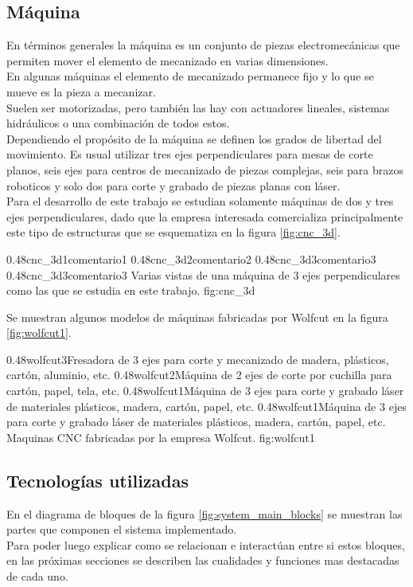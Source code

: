 \subsection{Máquina}
En términos generales la máquina es un conjunto de piezas electromecánicas que permiten mover el elemento de mecanizado en varias dimensiones.\\
En algunas máquinas el elemento de mecanizado permanece fijo y lo que se mueve es la pieza a mecanizar.\\
Suelen ser motorizadas, pero también las hay con actuadores lineales, sistemas hidráulicos o una combinación de todos estos.\\
Dependiendo el propósito de la máquina se definen los grados de libertad del movimiento.
Es usual utilizar tres ejes perpendiculares para mesas de corte planos, seis ejes para centros de mecanizado de piezas complejas, seis para brazos roboticos y solo dos para corte y grabado de piezas planas con láser.\\
Para el desarrollo de este trabajo se estudian solamente máquinas de dos y tres ejes perpendiculares, dado que la empresa interesada comercializa principalmente este tipo de estructuras que se esquematiza en la figura \ref{fig:cnc_3d}.

\subfigtwotwo
            {0.48}{cnc_3d1}{comentario1}
            {0.48}{cnc_3d2}{comentario2}
            {0.48}{cnc_3d3}{comentario3}
            {0.48}{cnc_3d3}{comentario3}
            {Varias vistas de una máquina de 3 ejes perpendiculares como las que se estudia en este trabajo.}
            {fig:cnc_3d}

Se muestran algunos modelos de máquinas fabricadas por Wolfcut en la figura \ref{fig:wolfcut1}.

\subfigtwotwo
            {0.48}{wolfcut3}{Fresadora de 3 ejes para corte y mecanizado de madera, plásticos, cartón, aluminio, etc.}
            {0.48}{wolfcut2}{Máquina de 2 ejes de corte por cuchilla para cartón, papel, tela, etc.}
            {0.48}{wolfcut1}{Máquina de 3 ejes para corte y grabado láser de materiales plásticos, madera, cartón, papel, etc.}
            {0.48}{wolfcut1}{Máquina de 3 ejes para corte y grabado láser de materiales plásticos, madera, cartón, papel, etc.}
            {Maquinas CNC fabricadas por la empresa Wolfcut.}
            {fig:wolfcut1}


\subsection{Tecnologías utilizadas}
   En el diagrama de bloques de la figura \ref{fig:system_main_blocks} se muestran las partes que componen el sistema implementado.\\ 
   Para poder luego explicar como se relacionan e interactúan entre si estos bloques, en las próximas secciones se describen las cualidades y funciones mas destacadas de cada uno.

